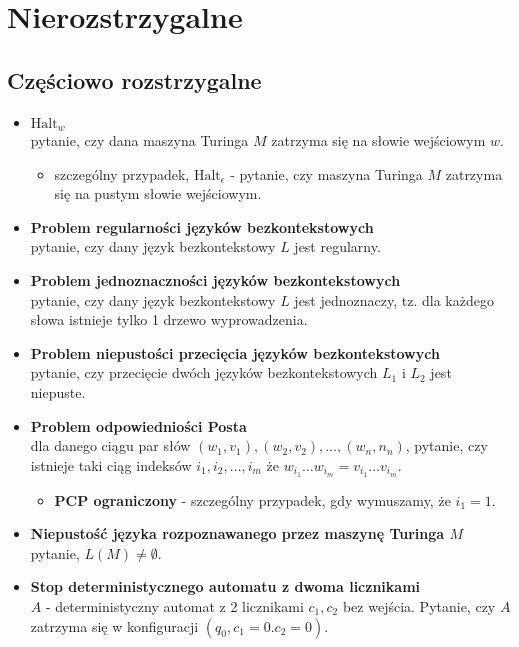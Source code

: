 \documentclass{article}
\theoremstyle{definition}
\theoremstyle{remark}
\begin{document}
\newpage

\section{Nierozstrzygalne}
\subsection{Częściowo rozstrzygalne}
\begin{itemize}
    \item \textbf{$\text{Halt}_w$} \\ 
    pytanie, czy dana maszyna Turinga $M$ zatrzyma się na słowie wejściowym $w$. 
    
    \begin{itemize}
    \item szczególny przypadek, \textbf{$\text{Halt}_{\epsilon}$} - pytanie, czy maszyna Turinga $M$ zatrzyma się na pustym słowie wejściowym.
    \end{itemize}

    \newpage

    \item \textbf{Problem regularności języków bezkontekstowych} \\
    pytanie, czy dany język bezkontekstowy $L$ jest regularny.

    \item \textbf{Problem jednoznaczności języków bezkontekstowych} \\
    pytanie, czy dany język bezkontekstowy $L$ jest jednoznaczy, tz. dla każdego słowa istnieje tylko 1 drzewo wyprowadzenia.

    \newpage

    \item \textbf{Problem niepustości przecięcia języków bezkontekstowych} \\
    pytanie, czy przecięcie dwóch języków bezkontekstowych $L_1$ i $L_2$ jest niepuste.

    \item \textbf{Problem odpowiedniości Posta} \\
    dla danego ciągu par słów $(w_1, v_1), (w_2, v_2), \ldots, (w_n, n_n)$, pytanie, czy istnieje taki ciąg indeksów $i_1, i_2, \ldots, i_m$ że $ w_{i_1} \ldots w_{i_m} = v_{i_1} \ldots v_{i_m}$.
    
    \begin{itemize}
        \item \textbf{PCP ograniczony} - szczególny przypadek, gdy wymuszamy, że $i_1=1$.
    \end{itemize}

    \item \textbf{Niepustość języka rozpoznawanego przez maszynę Turinga $M$} \\
    pytanie, $L(M) \neq \emptyset$.
    
    \item \textbf{Stop deterministycznego automatu z dwoma licznikami} \\
    $A$ - deterministyczny automat z 2 licznikami $c_1, c_2$ bez wejścia. Pytanie, czy $A$ zatrzyma się w konfiguracji $(q_0, c_1 = 0. c_2=0)$.
\end{itemize}
\end{document}
